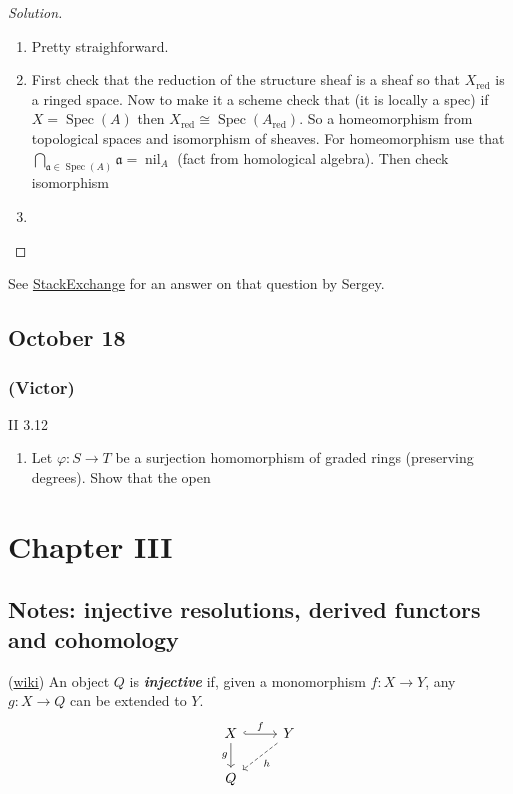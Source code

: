 \begin{proof}[Solution]\leavevmode
	\begin{enumerate}
		\item Pretty straighforward.

		\item First check that the reduction of the structure sheaf is a sheaf  so that $X_{\operatorname{red}}$ is a ringed space. Now to make it a scheme check that (it is locally a spec) if  $X=\operatorname{Spec}(A)$ then $X_{\operatorname{red}}\cong \operatorname{Spec}(A_{\operatorname{red}})$. So a homeomorphism from topological spaces and isomorphism of sheaves. For homeomorphism use that $\bigcap_{\mathfrak{a}\in\operatorname{Spec}(A)} \mathfrak{a}=\operatorname{nil}_A$ (fact from homological algebra). Then check isomorphism
	
		\item 
	\end{enumerate}
\end{proof}

See \href{https://math.stackexchange.com/questions/4158529/computing-the-image-of-a-projective-variety}{StackExchange} for an answer on that question by Sergey.

\section{October 18}

\subsection{(Victor)}

\begin{thing3}{II 3.12}\leavevmode
	\begin{enumerate}[label=\alph*.]
		\item Let $\varphi:S\to T$ be a surjection homomorphism of graded rings (preserving degrees). Show that the open 
	\end{enumerate}
\end{thing3}

\chapter{Chapter III}

\section{Notes: injective resolutions, derived functors and cohomology}
\begin{defn}
	(\href{https://en.wikipedia.org/wiki/Injective_object#:~:text=9%20References-,Definition,can%20be%20extended%20to%20Y%20.}{wiki}) An object $Q$ is \textit{\textbf{injective}} if, given a monomorphism $f:X\to Y$, any $g:X\to Q$ can be extended to $Y$.
\[\begin{tikzcd}
X\arrow[r,"f",hook]\arrow[d,"g",swap]&Y\arrow[dl,"h",dashed]\\
Q
\end{tikzcd}\]
\end{defn}

